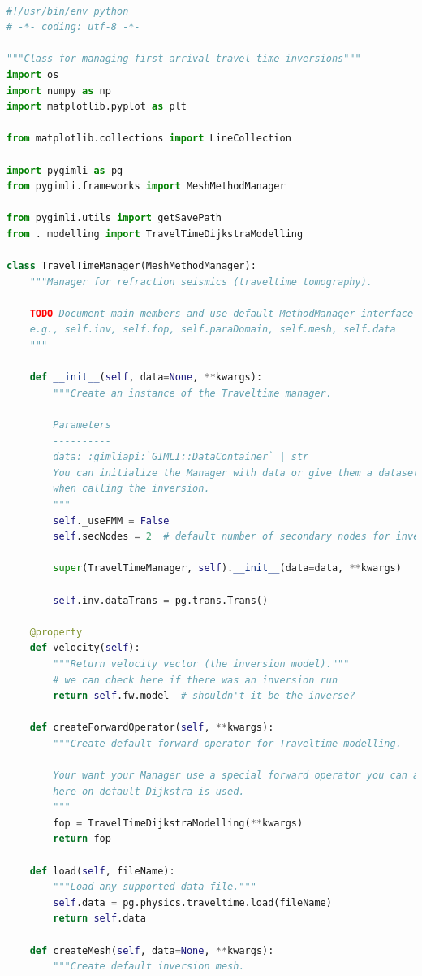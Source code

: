 \documentclass[a4paper, 12 pt]{article} %
\begin{document}
\begin{lstlisting}[language=Python, caption=Código-fonte para pygimli.physics.traveltime.TravelTimeManager]

#!/usr/bin/env python
# -*- coding: utf-8 -*-

"""Class for managing first arrival travel time inversions"""
import os
import numpy as np
import matplotlib.pyplot as plt

from matplotlib.collections import LineCollection

import pygimli as pg
from pygimli.frameworks import MeshMethodManager

from pygimli.utils import getSavePath
from . modelling import TravelTimeDijkstraModelling

class TravelTimeManager(MeshMethodManager):
	"""Manager for refraction seismics (traveltime tomography).
	
	TODO Document main members and use default MethodManager interface
	e.g., self.inv, self.fop, self.paraDomain, self.mesh, self.data
	"""
	
	def __init__(self, data=None, **kwargs):
		"""Create an instance of the Traveltime manager.
		
		Parameters
		----------
		data: :gimliapi:`GIMLI::DataContainer` | str
		You can initialize the Manager with data or give them a dataset
		when calling the inversion.
		"""
		self._useFMM = False
		self.secNodes = 2  # default number of secondary nodes for inversion
		
		super(TravelTimeManager, self).__init__(data=data, **kwargs)
		
		self.inv.dataTrans = pg.trans.Trans()
	
	@property
	def velocity(self):
		"""Return velocity vector (the inversion model)."""
		# we can check here if there was an inversion run
		return self.fw.model  # shouldn't it be the inverse?
	
	def createForwardOperator(self, **kwargs):
		"""Create default forward operator for Traveltime modelling.
		
		Your want your Manager use a special forward operator you can add them
		here on default Dijkstra is used.
		"""
		fop = TravelTimeDijkstraModelling(**kwargs)
		return fop
	
	def load(self, fileName):
		"""Load any supported data file."""
		self.data = pg.physics.traveltime.load(fileName)
		return self.data
	
	def createMesh(self, data=None, **kwargs):
		"""Create default inversion mesh.
		

\end{lstlisting}
\end{document}
